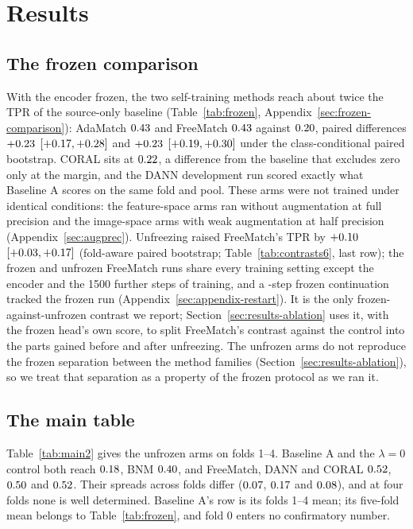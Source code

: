 \section{Results}
\label{sec:results}

\subsection{The frozen comparison}
\label{sec:results-frozen}

With the encoder frozen, the two self-training methods reach about twice the TPR of the
source-only baseline (Table~\ref{tab:frozen}, Appendix~\ref{sec:frozen-comparison}): AdaMatch $0.43{}$ and FreeMatch
$0.43{}$ against $0.20{}$, paired differences $+0.23{}$
$[+0.17{}, +0.28{}]$ and $+0.23{}$ $[+0.19{}, +0.30{}]$
under the class-conditional paired bootstrap. CORAL sits at $0.22{}$, a difference
from the baseline that excludes zero only at the margin, and the DANN development run scored
exactly what Baseline A scores on the same fold and pool. These arms were not trained under
identical conditions: the feature-space arms ran without augmentation at full precision and the
image-space arms with weak augmentation at half precision (Appendix~\ref{sec:augprec}).
Unfreezing raised FreeMatch's TPR by $+0.10{}$ $[+0.03{}, +0.17{}]$ (fold-aware paired
bootstrap; Table~\ref{tab:contrasts6}, last row); the frozen and unfrozen FreeMatch runs share
every training setting except the encoder and the 1500 further steps of training, and a
\restartControlStepsNs{}-step frozen continuation tracked the frozen run
(Appendix~\ref{sec:appendix-restart}). It is the only frozen-against-unfrozen contrast we
report; Section~\ref{sec:results-ablation} uses it, with the frozen head's own score, to split
FreeMatch's contrast against the control into the parts gained before and after unfreezing.
The unfrozen arms do not reproduce the
frozen separation between the method families (Section~\ref{sec:results-ablation}), so we treat
that separation as a property of the frozen protocol as we ran it.

\subsection{The main table}
\label{sec:results-main}

Table~\ref{tab:main2} gives the unfrozen arms on folds 1--4. Baseline A and the $\lambda=0$
control both reach $0.18{}$, BNM $0.40{}$, and FreeMatch, DANN and CORAL
$0.52{}$, $0.50{}$ and $0.52{}$. Their spreads across folds differ
($0.07{}$, $0.17{}$ and $0.08{}$), and at four folds none is well
determined. Baseline A's row is its folds 1--4 mean; its five-fold mean belongs to
Table~\ref{tab:frozen}, and fold 0 enters no confirmatory number.

